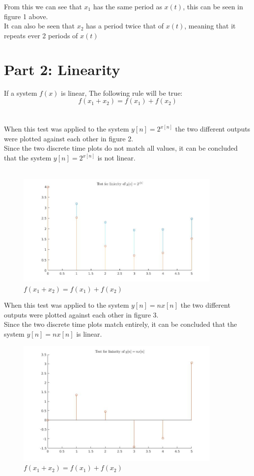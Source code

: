\documentclass[a4paper,11pt]{article}
\begin{document}
From this we can see that $x_1$ has the same period as $x(t)$, this can be seen in figure 1 above.\\ 
It can also be seen that $x_2$ has a period twice that of $x(t)$, meaning that it repeats ever 2 periods of $x(t)$
\newpage

\section*{Part 2: Linearity}
If a system $f(x)$ is linear, The following rule will be true:\\
$$f(x_1+x_2) = f(x_1)+f(x_2)$$\\ \\
When this test was applied to the system $y[n]=2^{x[n]}$ the two different outputs were plotted against each other in figure 2.\\
Since the two discrete time plots do not match all values, it can be concluded that the system $y[n]=2^{x[n]}$ is not linear.\\ \\
\begin{figure}[h]
\centering
\includegraphics[width=10cm]{linarity_test_1.jpg}
\caption{$f(x_1+x_2) = f(x_1)+f(x_2)$}
\end{figure}

When this test was applied to the system $y[n]=nx[n]$ the two different outputs were plotted against each other in figure 3.\\
Since the two discrete time plots match entirely, it can be concluded that the system $y[n]=nx[n]$ is linear.
\begin{figure}[h]
\centering
\includegraphics[width=10cm]{linarity_test_2.jpg}
\caption{$f(x_1+x_2) = f(x_1)+f(x_2)$}
\end{figure}
\newpage
\end{document}
